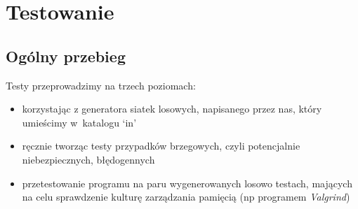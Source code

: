 \documentclass{article}
\begin{document}
\newpage
\section{Testowanie}
\subsection{Ogólny przebieg}
Testy przeprowadzimy na trzech poziomach:
\begin{itemize}
  \item korzystając z generatora siatek losowych, napisanego przez nas,
    który umieścimy w~katalogu ‘in’
  \item ręcznie tworząc testy przypadków brzegowych, czyli potencjalnie
    niebezpiecznych, błędogennych
  \item przetestowanie programu na paru wygenerowanych losowo testach, mających
    na celu sprawdzenie kulturę zarządzania pamięcią (np programem
    \textit{Valgrind})
\end{itemize}
\end{document}
